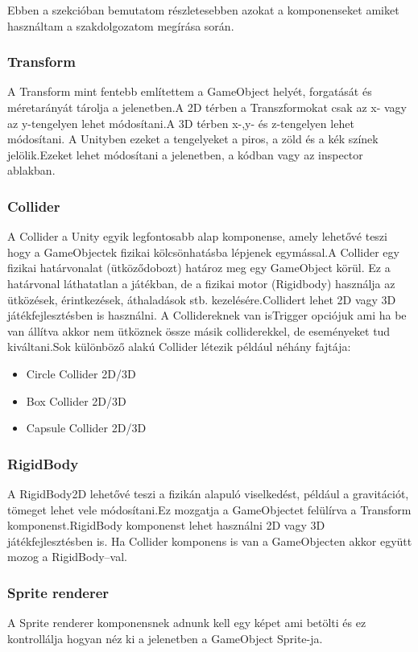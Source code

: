 \documentclass[
]{thesis-ekf}
\theoremstyle{definition}
\theoremstyle{remark}
\begin{document}
Ebben a szekcióban bemutatom részletesebben azokat a komponenseket amiket használtam a szakdolgozatom megírása során.

\subsubsection{Transform}
A Transform  mint fentebb említettem a GameObject helyét, forgatását és méretarányát tárolja a jelenetben.A 2D térben a Transzformokat csak az x- vagy az y-tengelyen lehet módosítani.A 3D térben x-,y- és z-tengelyen lehet módosítani.  A Unityben ezeket a tengelyeket a piros, a zöld és a kék színek jelölik.Ezeket lehet módosítani a jelenetben, a kódban vagy az inspector ablakban.\cite{UnityTransform}
\subsubsection{Collider}
A Collider a Unity egyik legfontosabb alap komponense, amely lehetővé teszi hogy a GameObjectek fizikai kölcsönhatásba lépjenek egymással.A Collider egy fizikai határvonalat (ütköződobozt) határoz meg egy GameObject körül. Ez a határvonal láthatatlan a játékban, de a fizikai motor (Rigidbody) használja az ütközések, érintkezések, áthaladások stb. kezelésére.Collidert lehet 2D vagy 3D játékfejlesztésben is használni. A Collidereknek van isTrigger opciójuk ami ha be van állítva akkor nem ütköznek össze másik colliderekkel, de eseményeket tud kiváltani.\cite{UnityCollider}Sok különböző alakú Collider létezik például néhány fajtája:
\begin{itemize}
	\item Circle Collider 2D/3D
	\item Box Collider 2D/3D
	\item Capsule Collider 2D/3D
\end{itemize}

\subsubsection{RigidBody}
A RigidBody2D lehetővé teszi a fizikán alapuló viselkedést, például a gravitációt, tömeget lehet vele módosítani.Ez mozgatja a GameObjectet felülírva a Transform komponenst.RigidBody komponenst lehet használni 2D vagy 3D játékfejlesztésben is. Ha Collider komponens is van a GameObjecten akkor együtt mozog a RigidBody--val.\cite{UnityRigidBody}

\subsubsection{Sprite renderer}
A Sprite renderer komponensnek adnunk kell egy képet ami betölti és ez kontrollálja hogyan néz ki a jelenetben a GameObject Sprite-ja.\cite{UnitySpriteRenderer}
\end{document}
